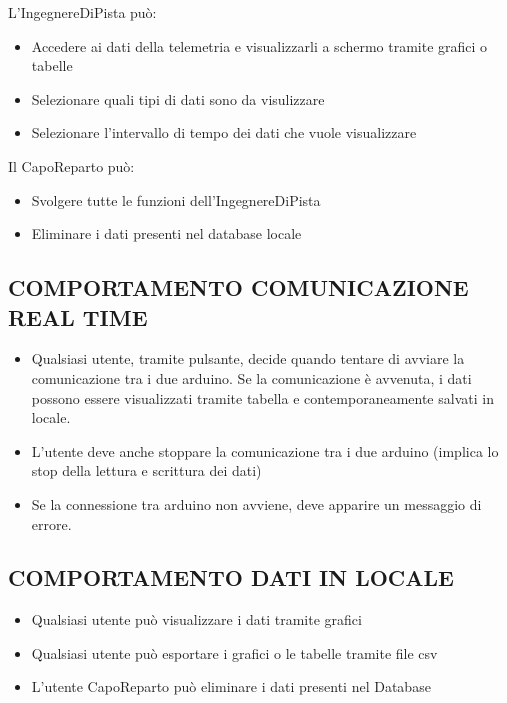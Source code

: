 \documentclass{report}
\begin{document}
L'IngegnereDiPista può:\\
\begin{itemize}
\item Accedere ai dati della telemetria e visualizzarli a schermo tramite grafici o tabelle 
\item Selezionare quali tipi di dati sono da visulizzare
\item Selezionare l’intervallo di tempo dei dati che vuole visualizzare\\
\end{itemize}

Il CapoReparto può:
\begin{itemize}
\item Svolgere tutte le funzioni dell’IngegnereDiPista
\item Eliminare i dati presenti nel database locale
\end{itemize}

\subsection{COMPORTAMENTO COMUNICAZIONE REAL TIME}
\begin{itemize}
\item Qualsiasi utente, tramite pulsante, decide quando tentare di avviare la comunicazione tra i due arduino.
Se la comunicazione è avvenuta, i dati possono essere visualizzati tramite tabella e contemporaneamente salvati in locale.
\item L’utente deve anche stoppare la comunicazione tra i due arduino (implica lo stop della lettura e scrittura dei dati)
\item Se la connessione tra arduino non avviene, deve apparire un messaggio di errore.
\end{itemize}

\subsection{COMPORTAMENTO DATI IN LOCALE}
\begin{itemize}
\item Qualsiasi utente può visualizzare i dati tramite grafici
\item Qualsiasi utente può esportare i grafici o le tabelle tramite file csv
\item L’utente CapoReparto può eliminare i dati presenti nel Database
\end{itemize}
\end{document}
